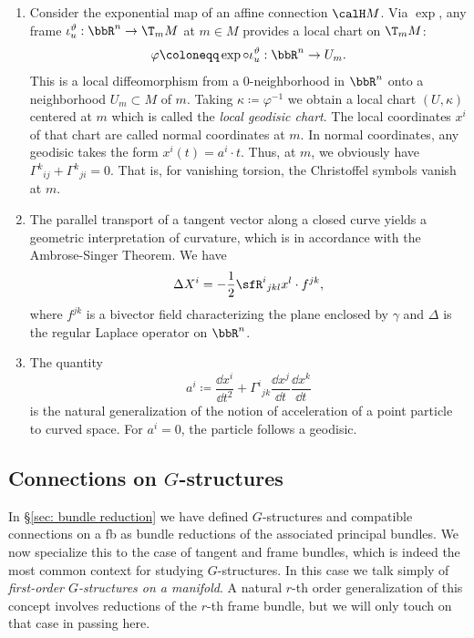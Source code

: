 \begin{rem}\label{rem 2.1.30 RS2}
    \begin{enumerate}
        \item Consider the exponential map of an affine connection $\calH M$. Via $\exp$, any frame $\iota_u^\vartheta:\bbR^n\to \T_m M$ at $m\in M$ provides a local chart on $\T_mM$:
        \[\varphi\coloneqq \exp\circ \iota_u^\vartheta:\bbR^n\to U_m.\]
        This is a local diffeomorphism from a $0$-neighborhood in $\bbR^n$ onto a  neighborhood $U_m\subset M$ of $m$. Taking $\kappa\coloneqq \varphi^{-1}$ we obtain a local chart $(U,\kappa)$ centered at $m$ which is called the \emph{local geodisic chart}. The local coordinates $x^i$ of that chart are called normal coordinates at $m$. In normal coordinates, any geodisic takes the form $x^i(t)=a^i\cdot t$. Thus, at $m$, we obviously have $\Gamma^k{}_{ij}+\Gamma^k{}_{ji}=0$. That is, for vanishing torsion, the Christoffel symbols vanish at $m$.
        \item The parallel transport of a tangent vector along a closed curve yields a geometric interpretation of curvature, which is in accordance with the Ambrose-Singer Theorem. We have 
        \[\Delta X^i=-\frac12 \sfR^i{}_{jkl}x^l\cdot f^{jk},\]
        where $f^{jk}$ is a bivector field characterizing the plane enclosed by $\gamma$ and $\Delta$ is the regular Laplace operator on $\bbR^n$.
        \item The quantity 
        \[a^i\coloneqq \frac{\dd x^i}{\dd t^2}+\Gamma^i{}_{jk}\frac{\dd x^j}{\dd t}\frac{\dd x^k}{\dd t}\]
        is the natural generalization of the notion of acceleration of a point particle to curved space. For $a^i=0$, the particle follows a geodisic.
    \end{enumerate}
\end{rem}





\subsection{Connections on \texorpdfstring{$G$}{G}-structures}

In \S\ref{sec: bundle reduction} we have defined $G$-structures and compatible connections on a \gls{fb} as bundle reductions of the associated principal bundles. We now specialize this to the case of tangent and frame bundles, which is indeed the most common context for studying $G$-structures. In this case we talk simply of \emph{first-order $G$-structures on a manifold}. A natural $r$-th order generalization of this concept involves reductions of the $r$-th frame bundle, but we will only touch on that case in passing here.

